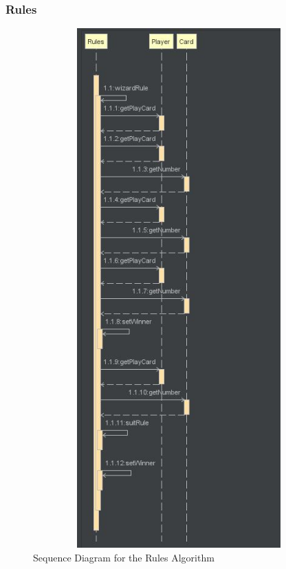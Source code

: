 \subsubsection{Rules}
\begin{figure}
\centering
\label{fig:Rules}
\includegraphics[width=15cm ,height=20cm,keepaspectratio]{RuleSequenceDiagram}
\caption{Sequence Diagram for the Rules Algorithm}
\end{figure}
